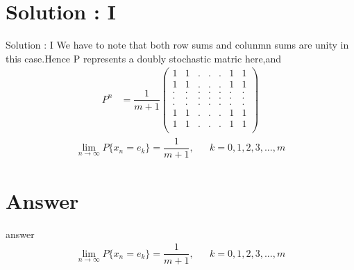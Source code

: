 \documentclass{beamer}
\begin{document}
\section{Solution : I}
\begin{frame}{Solution : I}
We have to note that both row sums and colunmn sums are unity in this case.Hence P represents a doubly stochastic matric here,and\\
\begin{align}
P^{n}&=\dfrac{1}{m+1}\begin{pmatrix}
1&1&.&.&.&1&1\\
1&1&.&.&.&1&1\\
.&.&.&.&.&.&.\\
.&.&.&.&.&.&.\\
.&.&.&.&.&.&.\\
1&1&.&.&.&1&1\\
1&1&.&.&.&1&1\\
\end{pmatrix}
\end{align}
\begin{align}
\lim_{n \to \infty} P\{x_n = e_k\} = \dfrac{1}{m+1}, && k=0,1,2,3,...,m
\end{align}
\end{frame} 
\section{Answer}
\begin{frame}{answer}
\begin{align}
\lim_{n \to \infty} P\{x_n = e_k\} = \dfrac{1}{m+1}, && k=0,1,2,3,...,m
\end{align}
\end{frame} 
\end{document}
